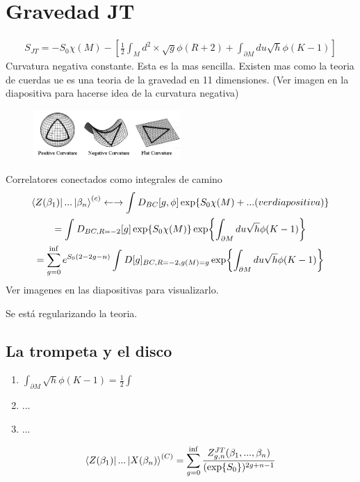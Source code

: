 \documentclass{article}
\newcommand{\caja}[2]{%
  \begin{tcolorbox}[colback=blue!5!white,colframe=blue!25!black,title=#1]
    #2
  \end{tcolorbox}%
}
\begin{document}
\section{Gravedad JT } %
\label{sec:Gravedad JT }
\caja{Accion JT }{
  \begin{gather}
    S _{JT } =-S_0\chi(M)-[\frac{1}{2}\int_{M }^{}d^2 \times \sqrt{g} \phi (R+2) + \int_{\partial M }^{ } du \sqrt{h} \phi (K-1) ] 
    \label{eq:jtaction}
  \end{gather}
  Curvatura negativa constante. Esta es la mas sencilla. Existen mas como la teoria de cuerdas ue es una teoria de la gravedad en 11 dimensiones. (Ver imagen en la diapositiva para hacerse idea de la curvatura negativa)
  
}
\begin{figure}
  \begin{center}
    \includegraphics[width=0.5\textwidth]{"Pasted image.png"}
  \end{center}
  \caption{}
  \label{fig:}
\end{figure}

Correlatores conectados como integrales de camino 
\begin{gather}
  \bra{Z(\beta_1)}...\ket{\beta_n }^ {(c) } \leftarrow\rightarrow  \int_{}^{}D _{BC } [g,\phi ]\exp{S_0 \chi(M)+... (ver diapositiva)} \\
  = \int_{}^{} D _{BC,R=-2 } [g] \exp{S_0 \chi (M)}\exp{\int_{\partial M }^{}du \sqrt{h} \phi (K-1) }\\
 =\sum_{g=0 }^{\inf }e ^ {S_0(2-2g-n )}\int_{}^{}D[g] _{BC,R=-2, g(M)=g } \exp{\int_{\partial M }^{}du \sqrt{h} \phi (K-1) }
  \label{eq:correlatores }
\end{gather}
Ver imagenes en las diapositivas para visualizarlo. 

Se está regularizando la teoria. 

\subsection{La trompeta y el disco}
\begin{enumerate}
  \item $ \int_{\partial M }^{} \sqrt{h} \phi (K-1 )=\frac{1}{2}\int_{}^{}   $
  \item ... 
  \item ...
\end{enumerate}
\caja{Resultado final: expansion JT de jenus}{
  \begin{gather}
    \bra{Z(\beta_1 )}...\ket{X(\beta_n )}^ {(C) }=\sum_{g=0 }^{\inf }\frac{Z_{g,n}^ {JT }(\beta_1,...,\beta_n )}{(\exp{S_0})^ {2g+n-1 }} \\ 
    \label{eq:jtgenusexpansion}
  \end{gather}
}
\end{document}
